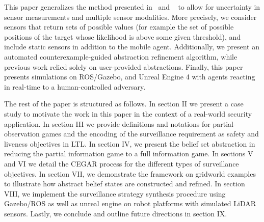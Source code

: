 This paper generalizes the method presented in~\cite{bharadwaj2018synthesis} and ~\cite{bharadwaj2018distributed} to allow for uncertainty in sensor measurements and multiple sensor modalities. More precisely, we consider sensors that return sets of possible values (for example the set of possible positions of the target whose likelihood is above some given threshold), and include static sensors in addition to the mobile agent. Additionally, we present an automated counterexample-guided abstraction refinement algorithm, while previous work relied solely on user-provided abstractions. Finally, this paper presents simulations on ROS/Gazebo, and Unreal Engine 4 with agents reacting in real-time to a human-controlled adversary.

The rest of the paper is structured as follows. In section II we present a case study to motivate the work in this paper in the context of a real-world security application. In section III we provide definitions and notations for partial-observation games and the encoding of the surveillance requirement as safety and liveness objectives in LTL. In section IV, we present the belief set abstraction in reducing the partial information game to a full information game. In sections V and VI we detail the CEGAR process for the different types of surveillance objectives. In section VII, we demonstrate the framework on gridworld examples to illustrate how abstract belief states are constructed and refined. In section VIII, we implement the surveillance strategy synthesis procedure using Gazebo/ROS as well as unreal engine on robot platforms with simulated LiDAR sensors. Lastly, we conclude and outline future directions in section IX.  





